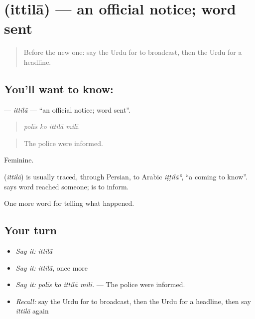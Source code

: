 \section[\texorpdfstring{\ur{اطلاع} (ittilā)}{اطلاع (ittilā)}]{ (ittilā) — an official notice; word sent}

\label{lesson:UR-C300-ittila}



\begin{quote}
Before the new one: say the Urdu for to broadcast, then the Urdu for a headline.
\end{quote}

\subsection*{You'll want to know: }
\textbf{} — \emph{ittilā} — \textquotedblleft{}an official notice; word sent\textquotedblright{}.

\begin{quote}
   
\end{quote}

\begin{quote}
\emph{polīs ko ittilā milī.}
\end{quote}

\begin{quote}
The police were informed.
\end{quote}

Feminine.

\begin{cousinweb}
\textbf{} (\emph{ittilā}) is usually traced, through Persian, to Arabic \emph{iṭṭilāʿ}, \textquotedblleft{}a coming to know\textquotedblright{}. \textbf{ } says word reached someone; \textbf{ } is to inform.
\end{cousinweb}

\begin{grammarlens}[title={What you've built}]
One more word for telling what happened.
\end{grammarlens}

\subsection*{Your turn}
\begin{itemize}
\raggedright
  \item \emph{Say it:} \emph{ittilā}
  \item \emph{Say it:} \emph{ittilā}, once more
  \item \emph{Say it:} \emph{polīs ko ittilā milī.} — The police were informed.
  \item \emph{Recall:} say the Urdu for to broadcast, then the Urdu for a headline, then say \emph{ittilā} again
\end{itemize}

